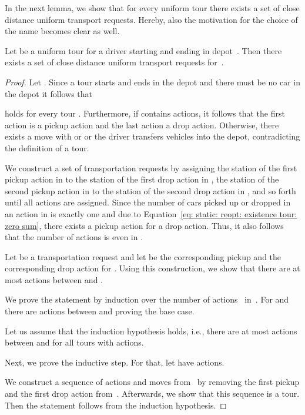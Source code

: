 \documentclass[english]{llncs}
\numberwithin{sublemma}{lemma}
\begin{document}
In the next lemma, we show that for every uniform tour there exists a set of close distance uniform transport requests.
Hereby, also the motivation for the choice of the name becomes clear as well.


\begin{lemma}
\label{lem: static: reopt: existence tour}
  Let  be a uniform tour for a driver starting and ending in depot~.
  Then there exists a set of close distance uniform transport requests for~.
\end{lemma}



\begin{proof}
Let .
Since a tour starts and ends in the depot and there must be no car in the depot it follows that

holds for every tour .
Furthermore, if  contains actions, it follows that the first action is a pickup action and the last action a drop action.
Otherwise, there exists a move  with  or  or the driver transfers vehicles into the depot, contradicting the definition of a tour.


We construct a set of transportation requests  by assigning the station of the first pickup action in  to the station of the first drop action in ,
the station of the second pickup action in  to the station of the second drop action in , and so forth until all actions are assigned.
Since the number of cars picked up or dropped in an action in  is exactly one and due to Equation~\eqref{eq: static: reopt: existence tour: zero sum},
there exists a pickup action for a drop action.
Thus, it also follows that the number of actions is even in .



Let  be a transportation request and let  be the corresponding pickup and  the corresponding drop action for .
Using this construction, we show that there are at most  actions between  and .

We prove the statement by induction over the number of actions~ in~.
For  and  there are  actions between  and  proving the base case.

Let us assume that the induction hypothesis holds, i.e., there are at most  actions between  and  for all tours with  actions.

Next, we prove the inductive step.
For that, let  have  actions.

We construct a sequence of  actions and  moves from~ by removing the first pickup and the first drop action from~.
Afterwards, we show that this sequence is a tour.
Then the statement follows from the induction hypothesis.


\end{proof}
\end{document}
